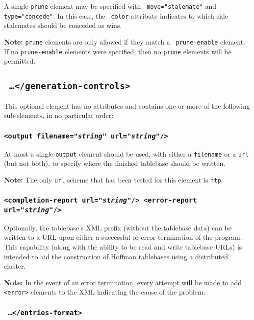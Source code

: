 \documentclass[11pt]{article}
\begin{document}
A single {\tt prune} element may be specified with {\tt
move="stalemate"} and {\tt type="concede"}.  In this case, the {\tt
color} attribute indicates to which side stalemates should be conceded
as wins.

{\bf Note:} {\tt prune} elements are only allowed if they match a {\tt
prune-enable} element.  If no {\tt prune-enable} elements were
specified, then no {\tt prune} elements will be permitted.

\subsection{\tt <generation-controls> \ldots\qquad </generation-controls>}

This optional element has no attributes and contains one or more
of the following sub-elements, in no particular order:

\subsubsection{\tt <output filename="{\it string}" url="{\it string}"/>}

At most a single {\tt output} element should be used, with either a
{\tt filename} or a {\tt url} (but not both), to specify where
the finished tablebase should be written.

{\bf Note:} The only {\tt url} scheme that has been tested for this
element is {\tt ftp}.

\subsubsection{\tt <completion-report url="{\it string}"/> \hfil\break <error-report url="{\it string}"/>}

Optionally, the tablebase's XML prefix (without the tablebase data) can
be written to a URL upon either a successful or error termination of
the program.  This capability (along with the ability to be read and
write tablebase URLs) is intended to aid the construction of Hoffman
tablebases using a distributed cluster.

{\bf Note:} In the event of an error termination, every attempt will
be made to add {\tt <error>} elements to the XML indicating the
cause of the problem.

\subsubsection{\tt <entries-format> \ldots\quad </entries-format>}
\end{document}
